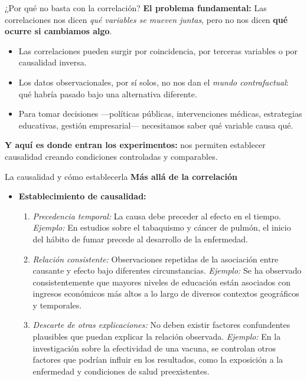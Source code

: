 ﻿\documentclass{beamer}
\begin{document}
\begin{frame}{¿Por qué no basta con la correlación?}
\textbf{El problema fundamental:}  
Las correlaciones nos dicen \emph{qué variables se mueven juntas},  
pero no nos dicen \textbf{qué ocurre si cambiamos algo}.

\vspace{0.4cm}

\begin{itemize}
    \item Las correlaciones pueden surgir por coincidencia, por terceras variables o por causalidad inversa.
    \item Los datos observacionales, por sí solos, no nos dan el \textit{mundo contrafactual}: qué habría pasado bajo una alternativa diferente.
    \item Para tomar decisiones —políticas públicas, intervenciones médicas, estrategias educativas, gestión empresarial— necesitamos saber qué variable causa qué.
\end{itemize}

\vspace{0.4cm}

\textbf{Y aquí es donde entran los experimentos:}  
nos permiten establecer causalidad creando condiciones controladas y comparables.
\end{frame}



\begin{frame}{La causalidad y cómo establecerla}
\textbf{Más allá de la correlación}

\begin{itemize}
    \item \textbf{Establecimiento de causalidad:}
    \begin{enumerate}
        \item \textit{Precedencia temporal:} La causa debe preceder al efecto en el tiempo. \textit{Ejemplo:} En estudios sobre el tabaquismo y cáncer de pulmón, el inicio del hábito de fumar precede al desarrollo de la enfermedad.
        \item \textit{Relación consistente:} Observaciones repetidas de la asociación entre causante y efecto bajo diferentes circunstancias. \textit{Ejemplo:} Se ha observado consistentemente que mayores niveles de educación están asociados con ingresos económicos más altos a lo largo de diversos contextos geográficos y temporales.
        \item \textit{Descarte de otras explicaciones:} No deben existir factores confundentes plausibles que puedan explicar la relación observada. \textit{Ejemplo:} En la investigación sobre la efectividad de una vacuna, se controlan otros factores que podrían influir en los resultados, como la exposición a la enfermedad y condiciones de salud preexistentes.
    \end{enumerate}
\end{itemize}
\end{frame}
\end{document}
